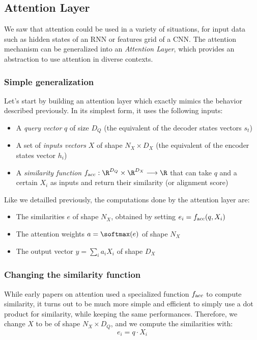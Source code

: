 \subsection{Attention Layer}
We saw that attention could be used in a variety of situations, for input data such as hidden states of an RNN or features grid of a CNN. The attention mechanism can be generalized into an \emph{Attention Layer}, which provides an abstraction to use attention in diverse contexts.

\subsubsection{Simple generalization}
Let's start by building an attention layer which exactly mimics the behavior described previously. In its simplest form, it uses the following inputs:
\begin{itemize}
    \item A \emph{query vector} $q$ of size $D_Q$ (the equivalent of the decoder states vectors $s_t$)
    \item A set of \emph{inputs vectors} $X$ of shape $N_X\times D_X$ (the equivalent of the encoder states vector $h_i$)
    \item A \emph{similarity function} $f_{\textnormal{acc}}:\R^{D_Q}\times\R^{D_X} \longrightarrow \R$ that can take $q$ and a certain $X_i$ as inputs and return their similarity (or alignment score)
\end{itemize}
Like we detailled previously, the computations done by the attention layer are:
\begin{itemize}
    \item The similarities $e$ of shape $N_X$, obtained by setting $e_i = f_{\textnormal{acc}}(q, X_i)$
    \item The attention weights $a=\softmax(e)$ of shape $N_X$
    \item The output vector $y = \sum_i a_i X_i$ of shape $D_X$
\end{itemize}

\subsubsection{Changing the similarity function}
While early papers on attention used a specialized function $f_{\textnormal{acc}}$ to compute similarity, it turns out to be much more simple and efficient to simply use a dot product for similarity, while keeping the same performances. Therefore, we change $X$ to be of shape $N_X\times D_Q$, and we compute the similarities with:
\begin{equation*}
    e_i = q\cdot X_i
\end{equation*}

